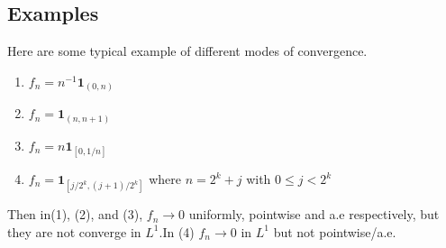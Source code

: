 \documentclass{article}
\theoremstyle{definition}
\begin{document}
\subsection{Examples}

Here are some typical example of different modes of convergence.
\begin{enumerate}[(1)]
\item $f_n=n^{-1}\mathbf{1}_{(0,n)}$
\item $f_n=\mathbf{1}_{(n,n+1)}$
\item $f_n=n\mathbf{1}_{[0,1/n]}$
\item $f_n=\mathbf{1}_{[j/2^k,(j+1)/2^k]}$ where $n=2^k+j$ with $0\leq j<2^k$
\end{enumerate}

Then in(1), (2), and (3), $f_n \rightarrow 0$ uniformly, pointwise and a.e respectively, but they are not converge in $L^1$.In (4) $f_n \rightarrow 0$ in $L^1$ but not pointwise/a.e.
\end{document}
